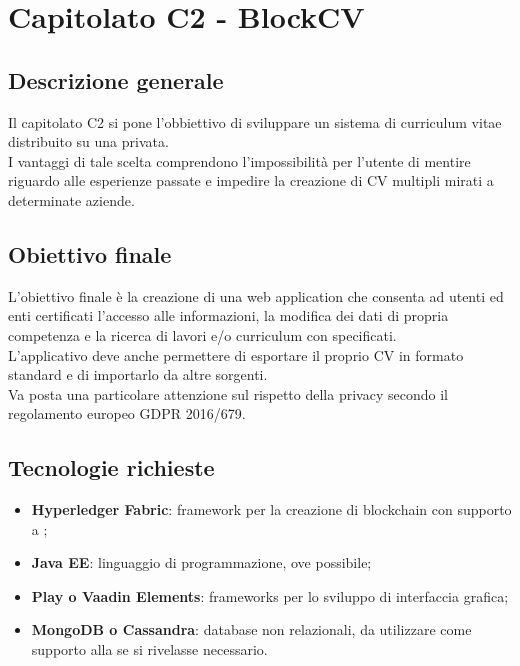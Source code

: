 \documentclass[StudioDiFattibilità.tex]{subfiles}
\begin{document}
\chapter{Capitolato C2 - BlockCV}
\section{Descrizione generale}
Il capitolato C2 si pone l'obbiettivo di sviluppare un sistema di curriculum vitae distribuito su una  privata.\\
I vantaggi di tale scelta comprendono l'impossibilità per l'utente di mentire riguardo alle esperienze passate e impedire la creazione di CV multipli mirati a determinate aziende.
\section{Obiettivo finale}
L'obiettivo finale è la creazione di una web application che consenta ad utenti ed enti certificati l'accesso alle informazioni, la modifica dei dati di propria competenza e la ricerca di lavori e/o curriculum con  specificati.\\
L'applicativo deve anche permettere di esportare il proprio CV in formato standard e di importarlo da altre sorgenti.\\
Va posta una particolare attenzione sul rispetto della privacy secondo il regolamento europeo GDPR 2016/679.
\section{Tecnologie richieste}
\begin{itemize}
	\item \textbf{Hyperledger Fabric}: framework per la creazione di blockchain con supporto a ;
	\item \textbf{Java EE}: linguaggio di programmazione, ove possibile;
	\item \textbf{Play o Vaadin Elements}: frameworks per lo sviluppo di interfaccia grafica;
	\item \textbf{MongoDB o Cassandra}: database non relazionali, da utilizzare come supporto alla  se si rivelasse necessario.
\end{itemize}
\end{document}
